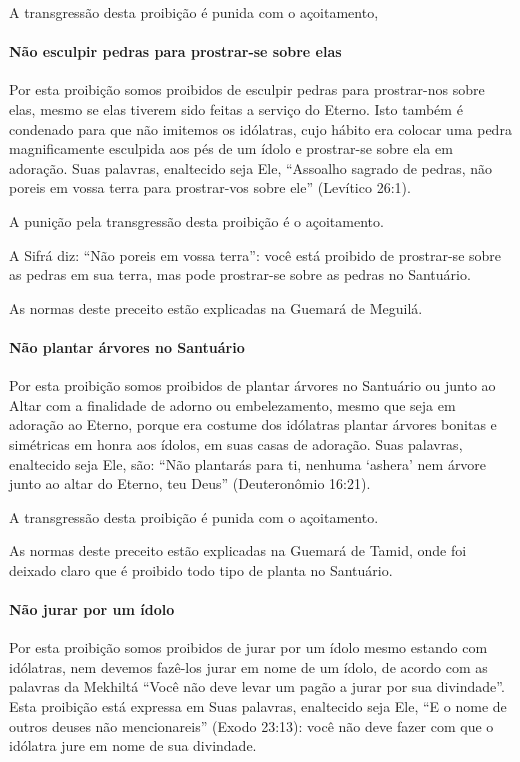 A transgressão desta proibição é punida com o açoitamento,

\paragraph{Não esculpir pedras para prostrar-se sobre elas}

Por esta proibição somos proibidos de esculpir pedras para prostrar-nos
sobre elas, mesmo se elas tiverem sido feitas a serviço do Eterno. Isto
também é condenado para que não imitemos os idólatras, cujo hábito era
colocar uma pedra magnificamente esculpida aos pés de um ídolo e prostrar-se
sobre ela em adoração. Suas palavras, enaltecido seja Ele, ``Assoalho
sagrado de pedras, não poreis em vossa terra para prostrar-vos sobre
ele'' (Levítico 26:1).

A punição pela transgressão desta proibição é o açoitamento.

A Sifrá diz: ``Não poreis em vossa terra'': você está proibido de
prostrar-se sobre as pedras em sua terra, mas pode prostrar-se sobre as
pedras no Santuário.

As normas deste preceito estão explicadas na Guemará de Meguilá.

\paragraph{Não plantar árvores no Santuário}

Por esta proibição somos proibidos de plantar árvores no Santuário ou
junto ao Altar com a finalidade de adorno ou embelezamento, mesmo que
seja em adoração ao Eterno, porque era costume dos idólatras plantar
árvores bonitas e simétricas em honra aos ídolos, em suas casas de
adoração. Suas palavras, enaltecido seja Ele, são: ``Não plantarás para
ti, nenhuma `ashera' nem árvore junto ao altar do Eterno, teu Deus''
(Deuteronômio 16:21).

A transgressão desta proibição é punida com o açoitamento.

As normas deste preceito estão explicadas na Guemará de Tamid, onde foi
deixado claro que é proibido todo tipo de planta no Santuário.

\paragraph{Não jurar por um ídolo}

Por esta proibição somos proibidos de jurar por um ídolo mesmo estando
com idólatras, nem devemos fazê-los jurar em nome de um ídolo, de acordo
com as palavras da Mekhiltá ``Você não deve levar um pagão a jurar por
sua divindade''. Esta proibição está expressa em Suas palavras,
enaltecido seja Ele, ``E o nome de outros deuses não mencionareis''
(Exodo 23:13): você não deve fazer com que o idólatra jure em nome de
sua divindade.

